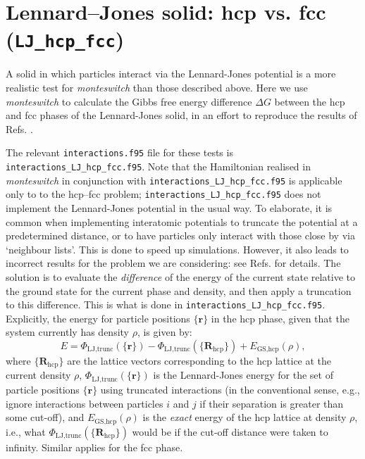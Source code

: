 \documentclass{report}
\begin{document}
\section{Lennard--Jones solid: hcp vs. fcc (\texttt{LJ\_hcp\_fcc})}
A solid in which particles interact via the Lennard-Jones potential is a more realistic test for \emph{monteswitch} than those described
above. Here we use \emph{monteswitch} to calculate the Gibbs free energy difference $\Delta G$ between the hcp and fcc phases of the 
Lennard-Jones solid, in an effort to reproduce the results of Refs. \cite{thesis:Jackson,Jackson_2002}. 

The relevant \texttt{interactions.f95} file for these tests is \texttt{interactions\_LJ\_hcp\_fcc.f95}. 
Note that the Hamiltonian realised in \emph{monteswitch} in conjunction with \texttt{interactions\_LJ\_hcp\_fcc.f95} is applicable only to
to the hcp--fcc problem; \texttt{interactions\_LJ\_hcp\_fcc.f95} does not implement the Lennard-Jones potential in the usual way. To elaborate,
it is common when implementing interatomic potentials to truncate the potential at a predetermined distance, or to have particles only interact
with those close by via `neighbour lists'. This is done to speed up simulations. However, it also leads to incorrect
results for the problem we are considering: see Refs. \cite{thesis:Jackson,Jackson_2002} for details. The solution is to evaluate 
the \emph{difference} of the energy of the current state relative to the ground state for the current phase and density, and then apply a
truncation to this difference. This is what is done in \texttt{interactions\_LJ\_hcp\_fcc.f95}. Explicitly, the energy for particle
positions $\lbrace\mathbf{r}\rbrace$ in the hcp phase, given that the system currently has density $\rho$, is given by:
\begin{equation}
E = \Phi_{\text{LJ,trunc}}(\lbrace\mathbf{r}\rbrace)-\Phi_{\text{LJ,trunc}}(\lbrace\mathbf{R}_{\text{hcp}}\rbrace)
+ E_{\text{GS,hcp}}(\rho),
\end{equation}
where $\lbrace\mathbf{R}_{\text{hcp}}\rbrace$ are the lattice vectors corresponding to the hcp lattice at the current density $\rho$, 
$\Phi_{\text{LJ,trunc}}(\lbrace\mathbf{r}\rbrace)$ is the Lennard-Jones energy for the set of particle positions $\lbrace\mathbf{r}\rbrace$
using truncated interactions (in the conventional sense, e.g., ignore interactions between particles $i$ and $j$ if their separation is
greater than some cut-off), and $E_{\text{GS,hcp}}(\rho)$ is the \emph{exact} energy of the hcp lattice at density $\rho$, i.e., what 
$\Phi_{\text{LJ,trunc}}(\lbrace\mathbf{R}_{\text{hcp}}\rbrace)$ would be if the cut-off distance were taken to infinity. Similar applies
for the fcc phase.
\end{document}
